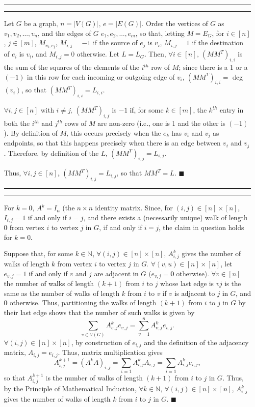 \documentclass[11pt]{article}
\newcounter{questionCounter}
\newcounter{partCounter}[questionCounter]
\newenvironment{question}[2][\arabic{questionCounter}]{%
    \setcounter{partCounter}{0}%
    \vspace{.25in} \hrule \vspace{0.5em}%
        \noindent{\bf #2}%
    \vspace{0.8em} \hrule \vspace{.10in}%
    \addtocounter{questionCounter}{1}%
}{}
\begin{document}
\begin{question}{Problem 6}
Let $G$ be a graph, $n = |V(G)|$, $e = |E(G)|$. Order the vertices of $G$ as
$v_1,v_2,\ldots,v_n$, and the edges of $G$ $e_1,e_2,\ldots,e_m$, so that,
letting $M = E_G$, for $i \in [n]$, $j \in [m]$, $M_{v_i,e_j}$,
$M_{i,j} = -1$ if the source of $e_j$ is $v_i$, $M_{i,j} = 1$ if the
destination of $e_i$ is $v_i$, and $M_{i,j} = 0$ otherwise. Let $L = L_G$.
Then, $\forall i \in [n]$, $\left(MM^T\right)_{i,i}$ is the sum of the squares
of the elements of the $i^{th}$ row of $M$; since there is a $1$ or a $(-1)$
in this row for each incoming or outgoing edge of $v_i$,
$\left(MM^T\right)_{i,i} =$ deg$(v_i)$, so that
$\left(MM^T\right)_{i,i} = L_{i,i}$.

$\forall i,j \in [n]$ with $i \neq j$, $\left(MM^T\right)_{i,j}$ is $-1$ if,
for some $k \in [m]$, the $k^{th}$ entry in both the $i^{th}$ and $j^{th}$
rows of $M$ are non-zero (i.e., one is $1$ and the other is $(-1)$). By
definition of $M$, this occurs precisely when the $e_k$ has $v_i$ and $v_j$ as
endpoints, so that this happens precisely when there is an edge between $v_i$
and $v_j$. Therefore, by definition of the $L$,
$\left(MM^T\right)_{i,j} = L_{i,j}$.

Thus, $\forall i,j \in [n]$, $\left(MM^T\right)_{i,j} = L_{i,j}$, so that
$MM^T = L$. \qquad $\blacksquare$
\end{question}

\begin{question}{Problem 7}
For $k = 0$, $A^k = I_n$ (the $n \times n$ identity matrix. Since, for
$(i,j) \in [n] \times [n]$, $I_{i,j} = 1$ if and only if $i = j$, and there
exists a (necessarily unique) walk of length $0$ from vertex $i$ to vertex $j$
in $G$, if and only if $i = j$, the claim in question holds for $k = 0$.

Suppose that, for some $k \in \mathbb{N}$, $\forall (i,j) \in [n] \times [n]$,
$A^k_{i,j}$ gives the number of walks of length $k$ from vertex $i$ to vertex
$j$ in $G$. $\forall (v,u) \in [n] \times [n]$, let $e_{v,j} = 1$ if and only
if $v$ and $j$ are adjacent in $G$ ($e_{v,j} = 0$ otherwise).
$\forall v \in [n]$ the number of walks of length $(k + 1)$ from $i$ to $j$
whose last edge is $vj$ is the same as the number of walks of length $k$ from
$i$ to $v$ if $v$ is adjacent to $j$ in $G$, and $0$ otherwise. Thus,
partitioning the walks of length $(k + 1)$ from $i$ to $j$ in $G$ by their
last edge shows that the number of such walks is given by
\[\sum_{v \in V(G)} A^k_{v,j}e_{v,j} = \sum_{v = 1}^n A^k_{v,j}e_{v,j}.\]
$\forall (i,j) \in [n] \times [n]$, by construction of $e_{i,j}$ and the
definition of the adjacency matrix, $A_{i,j} = e_{i,j}$. Thus, matrix
multiplication gives
\[A^{k + 1}_{i,j}
 = \left(A^kA\right)_{i,j}
 = \sum_{i = 1}A^k_{i,j}A_{i,j}
 = \sum_{i = 1}A^k_{i,j}e_{i,j},\]
so that $A^{k + 1}_{i,j}$ is the number of walks of length $(k + 1)$ from $i$
to $j$ in $G$. Thus, by the Principle of Mathematical Induction,
$\forall k \in \mathbb{N}$, $\forall (i,j) \in [n] \times [n]$, $A^k_{i,j}$
gives the number of walks of length $k$ from $i$ to $j$ in $G$.
\qquad $\blacksquare$
\end{question}
\end{document}

